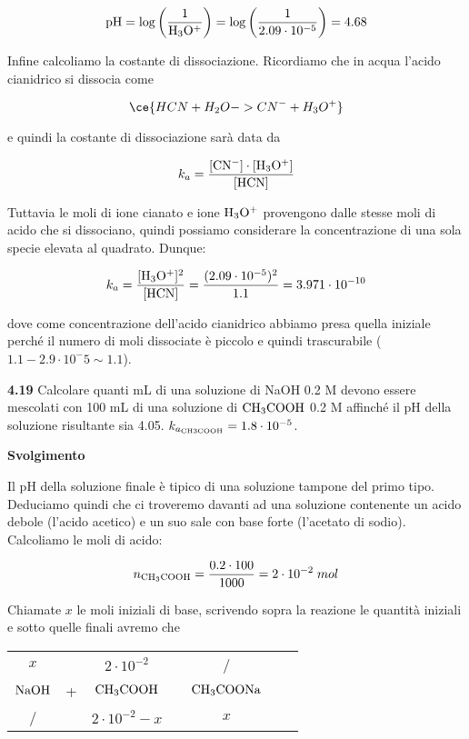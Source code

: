 $$\rm pH=\log{\left(\frac{1}{H_3O^+}\right)}
=\log{\left(\frac{1}{2.09 \cdot 10^{-5}}\right)}=4.68$$

Infine calcoliamo la costante di dissociazione. Ricordiamo che in acqua l'acido cianidrico si dissocia come

$$\ce{HCN + H_2O -> CN^- + H_3O^+}$$

e quindi la costante di dissociazione sarà data da

$$k_a=\rm \frac{[CN^-]\cdot[H_3O^+]}{[HCN]}$$

Tuttavia le moli di ione cianato e ione $\rm H_3O^+$ provengono dalle stesse moli di acido che si dissociano, quindi possiamo considerare la concentrazione di una sola specie elevata al quadrato. Dunque:

$$k_a=\rm \frac{[H_3O^+]^2}{[HCN]}=\frac{(2.09 \cdot 10^{-5})^2}{1.1}=3.971 \cdot 10^{-10}$$

dove come concentrazione dell'acido cianidrico abbiamo presa quella iniziale perché il numero di moli dissociate è piccolo e quindi trascurabile ($1.1 - 2.9 \cdot 10^-5 \sim 1.1$).

\vspace{0.2cm}\textbf{4.19}  Calcolare quanti mL di una soluzione di NaOH 0.2 M devono essere mescolati con
100 mL di una soluzione di $\rm CH_3COOH$ 0.2 M affinché il pH della soluzione risultante sia 4.05. $k_{a_{\rm CH3COOH}}=1.8 \cdot 10^{-5}$.

\vspace{0.2cm}\large\textbf{Svolgimento}\normalsize

\vspace{0.2cm}Il pH della soluzione finale è tipico di una soluzione tampone del primo tipo. Deduciamo quindi che ci troveremo davanti ad una soluzione contenente un acido debole (l'acido acetico) e un suo sale con base forte (l'acetato di sodio). Calcoliamo le moli di acido:

$$n_{\rm CH_3COOH}=\frac{0.2 \cdot 100}{1000}=2 \cdot 10^{-2}\;mol$$

Chiamate $x$ le moli iniziali di base, scrivendo sopra la reazione le quantità iniziali e sotto quelle finali avremo che

\begin{center}
    \begin{tabular}{ccccccc}
        $x$ & & $2 \cdot 10^{-2}$ & & /\\
        $\rm NaOH$ & + & $\rm CH_3COOH$ & \ce{<-->} & $\rm CH_3COONa$\\
        / & & $2 \cdot 10^{-2} - x$ & & $x$\\
    \end{tabular}
\end{center}


